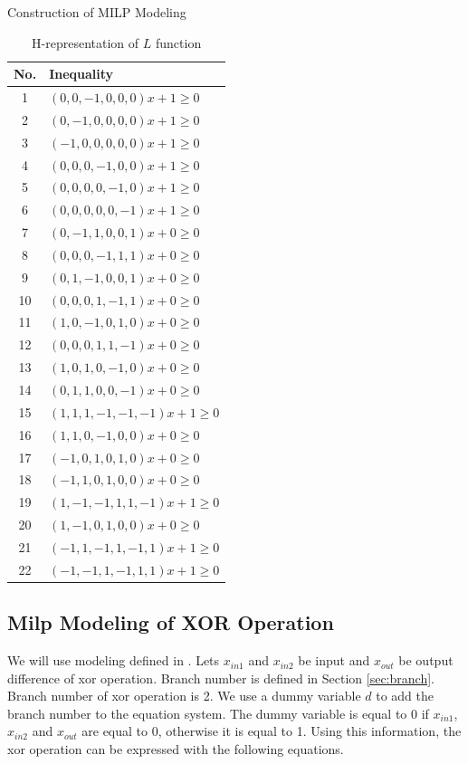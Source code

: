 \begin{section}{Construction of MILP Modeling}
\begin{table}[h]
\centering
\begin{tabular}{|c|l|}
\hline
\textbf{No.} & \textbf{Inequality} \\ \hline
1  & $(0, 0, -1, 0, 0, 0) x + 1 \geq 0$ \\ \hline
2  & $(0, -1, 0, 0, 0, 0) x + 1 \geq 0$ \\ \hline
3  & $(-1, 0, 0, 0, 0, 0) x + 1 \geq 0$ \\ \hline
4  & $(0, 0, 0, -1, 0, 0) x + 1 \geq 0$ \\ \hline
5  & $(0, 0, 0, 0, -1, 0) x + 1 \geq 0$ \\ \hline
6  & $(0, 0, 0, 0, 0, -1) x + 1 \geq 0$ \\ \hline
7  & $(0, -1, 1, 0, 0, 1) x + 0 \geq 0$ \\ \hline
8  & $(0, 0, 0, -1, 1, 1) x + 0 \geq 0$ \\ \hline
9  & $(0, 1, -1, 0, 0, 1) x + 0 \geq 0$ \\ \hline
10 & $(0, 0, 0, 1, -1, 1) x + 0 \geq 0$ \\ \hline
11 & $(1, 0, -1, 0, 1, 0) x + 0 \geq 0$ \\ \hline
12 & $(0, 0, 0, 1, 1, -1) x + 0 \geq 0$ \\ \hline
13 & $(1, 0, 1, 0, -1, 0) x + 0 \geq 0$ \\ \hline
14 & $(0, 1, 1, 0, 0, -1) x + 0 \geq 0$ \\ \hline
15 & $(1, 1, 1, -1, -1, -1) x + 1 \geq 0$ \\ \hline
16 & $(1, 1, 0, -1, 0, 0) x + 0 \geq 0$ \\ \hline
17 & $(-1, 0, 1, 0, 1, 0) x + 0 \geq 0$ \\ \hline
18 & $(-1, 1, 0, 1, 0, 0) x + 0 \geq 0$ \\ \hline
19 & $(1, -1, -1, 1, 1, -1) x + 1 \geq 0$ \\ \hline
20 & $(1, -1, 0, 1, 0, 0) x + 0 \geq 0$ \\ \hline
21 & $(-1, 1, -1, 1, -1, 1) x + 1 \geq 0$ \\ \hline
22 & $(-1, -1, 1, -1, 1, 1) x + 1 \geq 0$ \\ \hline
\end{tabular}
\caption{H-representation of $L$ function}
\label{tab:h-repineq}
\end{table}

\subsection{Milp Modeling of XOR Operation }
We will use modeling defined in \cite{mouha2012differential}. Lets $x_{in1}$ and $x_{in2}$ be input and $x_{out}$ be output difference of xor operation. Branch number is defined in Section \ref{sec:branch}. Branch number of xor operation is 2. We use a dummy variable $d$ to add the branch number to the equation system. The dummy variable is equal to 0 if $x_{in1}$, $x_{in2}$ and $x_{out}$ are equal to 0, otherwise it is equal to 1. Using this information, the xor operation can be expressed with the following equations.


\end{section}
